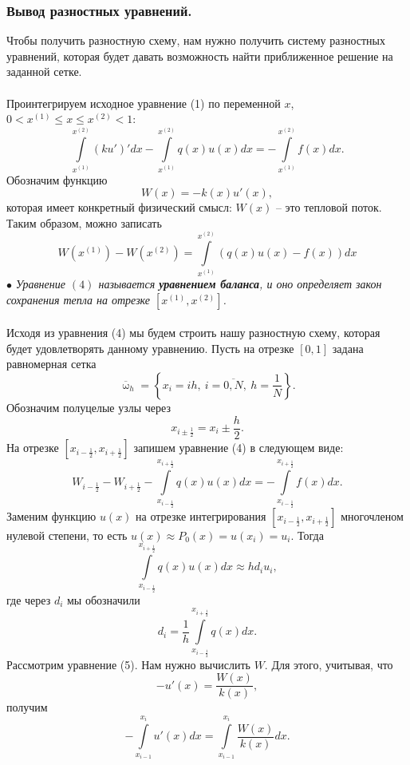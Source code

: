 \documentclass[a4paper, 12pt]{report}
\numberwithin{equation}{section}
\newcommand{\ol}{\overline}
\renewcommand{\leq}{\leqslant}
\renewcommand{\omega}{\upomega}
\begin{document}
	\subsubsection{Вывод разностных уравнений.}
	Чтобы получить разностную схему, нам нужно получить систему разностных уравнений, которая будет давать возможность найти приближенное решение на заданной сетке. \\\\
	Проинтегрируем исходное уравнение (1) по переменной $x$, $0<x^{(1)}\leq x \leq x^{(2)}<1$:
	$$\int\limits_{x^{(1)}}^{x^{(2)}} (ku')'dx - \int\limits_{x^{(1)}}^{x^{(2)}} q(x)u(x)dx = - \int\limits_{x^{(1)}}^{x^{(2)}} f(x)dx.$$
	Обозначим функцию
	$$W(x) = -k(x) u'(x),$$ которая имеет конкретный физический смысл: $W(x)$ -- это тепловой поток. Таким образом, можно записать
	\begin{equation}
		W(x^{(1)}) - W(x^{(2)})=\int\limits_{x^{(1)}}^{x^{(2)}} (q(x)u(x) - f(x))dx
	\end{equation} 
	$\bullet$ \textit{Уравнение $(4)$ называется \textbf{уравнением баланса}, и оно определяет закон сохранения тепла на отрезке $[x^{(1)}, x^{(2)}]$.}\\\\
	Исходя из уравнения (4) мы будем строить нашу разностную схему, которая будет удовлетворять данному уравнению.
	Пусть на отрезке $[0,1]$ задана равномерная сетка
	$$\ol \omega_h = \left\{x_i = ih,\ i = \overline{0,N}, \ h = \dfrac 1N\right\}.$$
	Обозначим  полуцелые узлы через $$x_{i\pm\frac 12} = x_i \pm \dfrac h2.$$
	На отрезке $[x_{i - \frac 12}, x_{i+\frac 12}]$ запишем уравнение (4) в следующем виде:
	\begin{equation}
		W_{i-\frac 12} - W_{i +\frac 12} - \int\limits_{x_{i-\frac12}}^{x_{i+\frac12}} q(x)u(x)dx  =  - \int\limits_{x_{i-\frac12}}^{x_{i+\frac12}}f(x)dx.
	\end{equation}
	Заменим функцию $u(x)$ на отрезке интегрирования $[x_{i - \frac 12}, x_{i+\frac 12}]$ многочленом нулевой степени, то есть $u(x) \approx P_0(x) = u(x_i) = u_i$. Тогда
	$$\int\limits_{x_{i-\frac12}}^{x_{i+\frac12}} q(x)u(x)dx \approx hd_i u_i,$$
	где через $d_i$ мы обозначили 
	\begin{equation}
		d_i =\dfrac 1h \int\limits_{x_{i-\frac12}}^{x_{i+\frac12}} q(x) dx.
	\end{equation}
	Рассмотрим уравнение (5). Нам нужно вычислить $W$. Для этого, учитывая, что 
	$$-u'(x) = \dfrac{W(x)}{k(x)},$$
	получим
	$$-\int\limits_{x_{i-1}}^{x_i} u'(x)dx = \int\limits_{x_{i-1}}^{x_i} \dfrac{W (x)}{k(x)}dx.$$
\end{document}
